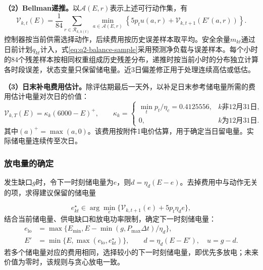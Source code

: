 \textbf{（2）Bellman递推。}以$\mathcal A(E,r)$表示上述可行动作集，有
\begin{equation}
    \mathcal V_{k,t}(E)
    =\frac{1}{84}\sum_{r\in\mathcal R_{k,h(t)}}
       \min_{a\in\mathcal A(E,r)}
       \left\{5p_tu(a,r)+\mathcal V_{k,t+1}(E'(a,r))\right\}.
    \label{eq:q2-bellman}
\end{equation}
控制器按当前供需选择动作，后续费用按历史误差样本取平均。安全余量$m_{kt}$通过日前计划$q_{kt}$计入，式\eqref{eq:q2-balance-sample}采用预测净负载与误差样本。每个小时的84个残差样本按相同权重组成历史残差分布，递推时按当前小时的分布独立计算各时段误差，状态变量只保留储电量。近3日偏差修正用于处理连续高估或低估。

\textbf{（3）日末补电费用估计。}除评估期最后一天外，以补足日末参考储电量所需的费用估计电量对次日的价值：
\begin{equation}
    \mathcal V_{k,T}(E)=\kappa_k(6000-E)^+,
    \qquad
    \kappa_k=\begin{cases}
    \min_t p_t/\eta_c=0.4125556,&k\text{非12月31日},\\
    0,&k\text{为12月31日}.
    \end{cases}
    \label{eq:q2-terminal}
\end{equation}
其中$(a)^+=\max(a,0)$。该费用按附件1电价估算，用于确定当日留电量。实际储电量连续传至次日。

\subsubsection{放电量的确定}

发生缺口$g$时，令下一时刻储电量为$e$，则$d=\eta_d(E-e)$。去掉费用中与动作无关的项，求得建议保留的储电量

\begin{equation}
    e_{kt}^{\star}\in\arg\min_e
      \{\mathcal V_{k,t+1}(e)+5p_t\eta_de\},
    \label{eq:q2-threshold}
\end{equation}
结合当前储电量、供电缺口和放电功率限制，确定下一时刻储电量：
\begin{equation}
\begin{aligned}
    e_{\mathrm{lo}}&=\max\{E_{\min},E-\min(g,P_{\max}\Delta t)/\eta_d\},\\
    E'&=\min\{E,\max(e_{\mathrm{lo}},e_{kt}^{\star})\},\qquad
    d=\eta_d(E-E'),\quad u=g-d.
\end{aligned}
\label{eq:q2-projection}
\end{equation}
若多个储电量对应的费用相同，选择较小的下一时刻储电量，即优先多放电；未来价值为零时，该规则与贪心放电一致。

